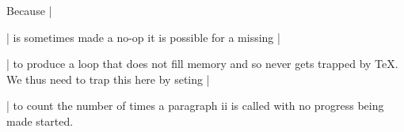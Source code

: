  \begin{macro}{\@trivlist}

 Because |\par| is sometimes made a no-op it is possible for a missing
 |\item| to produce a loop that does not fill memory and so never gets
 trapped by \TeX.  We thus need to trap this here by seting |\par| to
 count the number of times a paragraph ii is called with no progress
 being made started.
    \begin{teX}
\def\@trivlist{%
  \if@noskipsec \leavevmode \fi
  \@topsepadd \topsep
  \ifvmode
    \advance\@topsepadd \partopsep
  \else
    \unskip \par
  \fi
  \if@inlabel
    \@noparitemtrue
    \@noparlisttrue
  \else
    \if@newlist \@noitemerr \fi
    \@noparlistfalse
    \@topsep \@topsepadd
  \fi
  \advance\@topsep \parskip
  \leftskip \z@skip
  \rightskip \@rightskip
  \parfillskip \@flushglue
  \par@deathcycles \z@
  \@setpar{\if@newlist
             \advance\par@deathcycles \@ne
             \ifnum \par@deathcycles >\@m
               \@noitemerr
               {\@@par}%
             \fi
           \else
             {\@@par}%
           \fi}%
  \global \@newlisttrue
  \@outerparskip \parskip}
    \end{teX}
 \end{macro}

 
 \begin{macro}{\trivlist}
    \begin{teX}
\def\trivlist{%
  \parsep\parskip
  \@nmbrlistfalse
  \@trivlist
  \labelwidth\z@
  \leftmargin\z@
  \itemindent\z@
    \end{teX}

    We initialise |\@itemlabel| so that a \texttt{trivlist} with
    an |\item| not having an optional argument doesn't produce an
    error message.
 \changes{latex2e}{1993/12/13}{Initialised \cs{@itemlabel}}
    \begin{teX}
  \let\@itemlabel\@empty
  \def\makelabel##1{##1}}
    \end{teX}
 \end{macro}

 \begin{macro}{\endlist}
    \begin{teX}
\def\endlist{%
  \global\advance\@listdepth\m@ne
  \endtrivlist}
    \end{teX}
 \end{macro}

